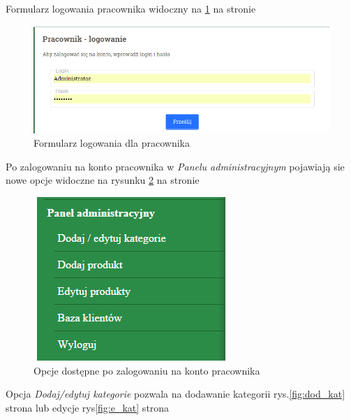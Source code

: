 Formularz logowania pracownika widoczny na \ref{fig:pracownik_logowanie} na stronie \pageref{fig:pracownik_logowanie}
\begin{figure}[H]
	\centering
	\includegraphics[width=15 cm] {fig/pracownik_logowanie}
	\caption{Formularz logowania dla pracownika}
	\label{fig:pracownik_logowanie}
\end{figure}
Po zalogowaniu na konto pracownika w \textit{Panelu administracyjnym}
pojawiają sie nowe opcje widoczne  na rysunku \ref{fig:panel_pracownik} na stronie \pageref{fig:panel_pracownik} 
\begin{figure}[H]
	\centering
	\includegraphics {fig/pracownik_logowanie_panel}
	\caption{Opcje dostępne po zalogowaniu na konto pracownika}
	\label{fig:panel_pracownik}
\end{figure}
Opcja \textit{Dodaj/edytuj kategorie} pozwala na dodawanie kategorii rys.\ref{fig:dod_kat} strona \pageref{fig:dod_kat} lub edycje rys\ref{fig:e_kat} strona \pageref{fig:e_kat}
